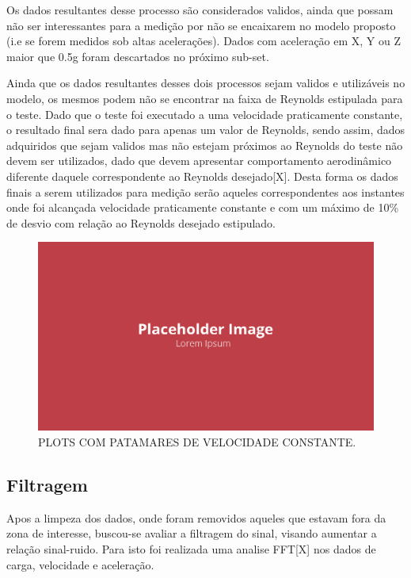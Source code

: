 Os dados resultantes desse processo são considerados validos, ainda que possam não ser interessantes para a medição por não se encaixarem no modelo proposto (i.e se forem medidos sob altas acelerações). Dados com aceleração em X, Y ou Z maior que 0.5g foram descartados no próximo sub-set.

Ainda que os dados resultantes desses dois processos sejam validos e utilizáveis no modelo, os mesmos podem não se encontrar na faixa de Reynolds estipulada para o teste. Dado que o teste foi executado a uma velocidade praticamente constante, o resultado final sera dado para apenas um valor de Reynolds, sendo assim, dados adquiridos que sejam validos mas não estejam próximos ao Reynolds do teste não devem ser utilizados, dado que devem apresentar comportamento aerodinâmico diferente daquele correspondente ao Reynolds desejado[X]. Desta forma os dados finais a serem utilizados para medição serão aqueles correspondentes aos instantes onde foi alcançada velocidade praticamente constante e com um máximo de 10\% de desvio com relação ao Reynolds desejado estipulado.

\begin{figure}[!ht]
    \centering
    \includegraphics[width=.8\linewidth]{figuras/placeholder.png}
    \caption{PLOTS COM PATAMARES DE VELOCIDADE CONSTANTE\cite{autor}.}
    \label{fig:placeholder}
\end{figure}

\subsection{Filtragem}

Apos a limpeza dos dados, onde foram removidos aqueles que estavam fora da zona de interesse, buscou-se avaliar a filtragem do sinal, visando aumentar a relação sinal-ruido. Para isto foi realizada uma analise FFT[X] nos dados de carga, velocidade e aceleração.

